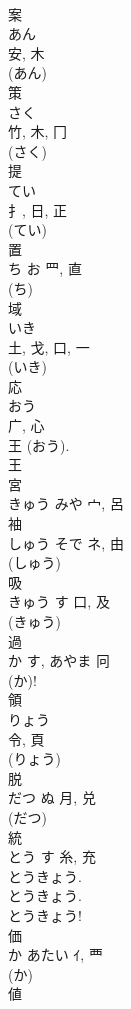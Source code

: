 \documentclass[8pt]{extreport}
\begin{document}
\begin{CJK}{UTF8}{min}
\\	案	
\\	あん	
\\	安, 木	
\\	(あん) 
\\	策	
\\	さく	
\\	竹, 木, 冂	
\\	(さく) 
\\	提	
\\	てい	
\\	扌, 日, 正	
\\	(てい) 
\\	置	
\\	ち	お	罒, 直	
\\	(ち) 
\\	域	
\\	いき	
\\	土, 戈, 口, 一	
\\	(いき) 
\\	応	
\\	おう	
\\	广, 心	
\\	王 (おう).	
\\	王 
\\	宮	
\\	きゅう	みや	宀, 呂	
\\	袖	
\\	しゅう	そで	ネ, 由	
\\	(しゅう) 
\\	吸	
\\	きゅう	す	口, 及	
\\	(きゅう) 
\\	過	
\\	か	す, あやま	冋		
\\	(か)! 
\\	領	
\\	りょう	
\\	令, 頁	
\\	(りょう) 
\\	脱	
\\	だつ	ぬ	月, 兑	
\\	(だつ) 
\\	統	
\\	とう	す	糸, 充	
\\	とうきょう. 
\\	とうきょう. 
\\	とうきょう!	
\\	価	
\\	か	あたい	ｲ, 覀	
\\	(か) 
\\	値	

\end{CJK}
\end{document}
